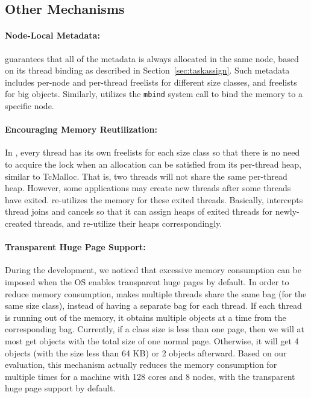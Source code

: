\subsection{Other Mechanisms}
\label{sec: others}

\paragraph{Node-Local Metadata:} \NM{} guarantees that all of the metadata is always allocated in the same node, based on its thread binding as described in Section~\ref{sec:taskassign}. Such metadata includes per-node and per-thread freelists for different size classes, and freelists for big objects. Similarly, \NM{} utilizes the \texttt{mbind} system call to bind the memory to a specific node.  

\paragraph{Encouraging Memory Reutilization:} In \NM{}, every thread has its own freelists for each size class so that there is no need to acquire the lock when an allocation can be satisfied from its per-thread heap, similar to TcMalloc. That is, two threads will not share the same per-thread heap. However, some applications may create new threads after some threads have exited. \NM{} re-utilizes the memory for these exited threads. Basically, \NM{} intercepts thread joins and cancels so that it can assign heaps of exited threads for newly-created threads, and re-utilize their heaps correspondingly.  


\paragraph{Transparent Huge Page Support:} During the development, we noticed that excessive memory consumption can be imposed when the OS enables transparent huge pages by default. In order to reduce memory consumption, \NM{} makes multiple threads share the same bag (for the same size class), instead of having a separate bag for each thread. If each thread is running out of the memory, it obtains multiple objects at a time from the corresponding bag. Currently, if a class size is less than one page, then we will at most get objects with the total size of one normal page. Otherwise, it will get 4 objects (with the size less than 64 KB) or 2 objects afterward. Based on our evaluation, this mechanism actually reduces the memory consumption for multiple times for a machine with 128 cores and 8 nodes, with the transparent huge page support by default.  


 

